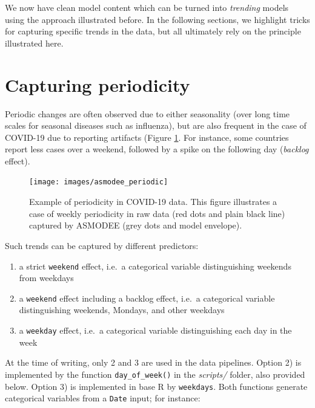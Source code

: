 \documentclass[]{book}
\providecommand{\tightlist}{%
  \setlength{\itemsep}{0pt}\setlength{\parskip}{0pt}}
\begin{document}
We now have clean model content which can be turned into \emph{trending} models using
the approach illustrated before. In the following sections, we highlight tricks
for capturing specific trends in the data, but all ultimately rely on the
principle illustrated here.

\hypertarget{capturing-periodicity}{%
\section{Capturing periodicity}\label{capturing-periodicity}}

Periodic changes are often observed due to either seasonality (over long time
scales for seasonal diseases such as influenza), but are also frequent in the
case of COVID-19 due to reporting artifacts (Figure
\ref{fig:asmodee-periodic}. For instance, some countries report less cases over
a weekend, followed by a spike on the following day (\emph{backlog} effect).

\begin{figure}

{\centering \texttt{[image: images/asmodee\_periodic]} 

}

\caption{Example of periodicity in COVID-19 data. This figure illustrates a case of weekly periodicity in raw data (red dots and plain black line) captured by ASMODEE (grey dots and model envelope).}\label{fig:asmodee-periodic}
\end{figure}

Such trends can be captured by different predictors:

\begin{enumerate}
\def\labelenumi{\arabic{enumi}.}
\tightlist
\item
  a strict \texttt{weekend} effect, i.e.~a categorical variable distinguishing weekends
  from weekdays
\item
  a \texttt{weekend} effect including a backlog effect, i.e.~a categorical variable
  distinguishing weekends, Mondays, and other weekdays
\item
  a \texttt{weekday} effect, i.e.~a categorical variable distinguishing each day in the week
\end{enumerate}

At the time of writing, only 2 and 3 are used in the data pipelines. Option 2)
is implemented by the function \texttt{day\_of\_week()} in the \emph{scripts/} folder, also
provided below. Option 3) is implemented in base R by \texttt{weekdays}. Both functions
generate categorical variables from a \texttt{Date} input; for instance:
\end{document}
